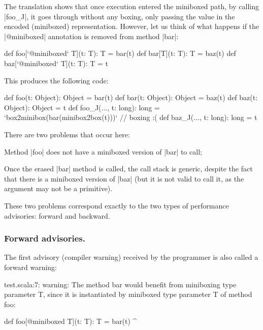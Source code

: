 The translation shows that once execution entered the miniboxed path, by calling |foo_J|, it goes through without any boxing, only passing the value in the encoded (miniboxed) representation. However, let us think of what happens if the |@miniboxed| annotation is removed from method |bar|:

\begin{lstlisting-nobreak}
 def foo[`@miniboxed` T](t: T): T = bar(t)
 def bar[T](t: T): T = baz(t)
 def baz[`@miniboxed` T](t: T): T = t
\end{lstlisting-nobreak}

This produces the following code:

\begin{lstlisting-nobreak}
 def foo(t: Object): Object = bar(t)
 def bar(t: Object): Object = baz(t)
 def baz(t: Object): Object = t
 def foo_J(..., t: long): long = `box2minibox(bar(minibox2box(t)))` // boxing :(
 def baz_J(..., t: long): long = t
\end{lstlisting-nobreak}

There are two problems that occur here:

\begin{compactitem}
 \item Method |foo| does not have a miniboxed version of |bar| to call;
 \item Once the erased |bar| method is called, the call stack is generic, despite the fact that there is a miniboxed version of |baz| (but it is not valid to call it, as the argument may not be a primitive).
\end{compactitem}

These two problems correspond exactly to the two types of performance advisories: forward and backward.

\subsubsection{Forward advisories.} The first advisory (compiler warning) received by the programmer is also called a forward warning:

\begin{lstlisting-nobreak-nolang}
test.scala:7: warning: The method bar would benefit from miniboxing type parameter T, since it is instantiated by miniboxed type parameter T of method foo:

       def foo[@miniboxed T](t: T): T = bar(t)
                                        ^
\end{lstlisting-nobreak-nolang}

